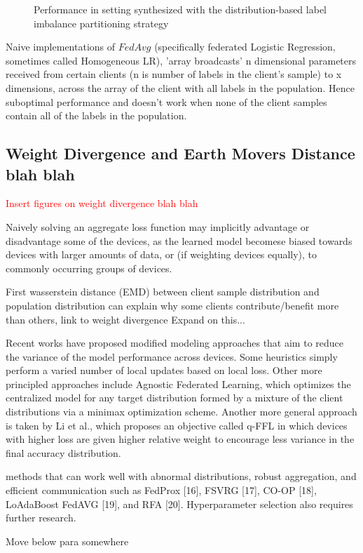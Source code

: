 \documentclass[letterpaper]{article} %
\begin{document}
\begin{figure}[h]
\caption{Performance in setting synthesized with the distribution-based label imbalance partitioning strategy}
\end{figure}


Naive implementations of $FedAvg$ (specifically federated Logistic Regression, sometimes called Homogeneous LR), 'array broadcasts' n dimensional parameters received from certain clients (n is number of labels in the client's sample) to x dimensions, across the array of the client with all labels in the population. Hence suboptimal performance and doesn't work when none of the client samples contain all of the labels in the population.

\subsection{Weight Divergence and Earth Movers Distance blah blah}

\textcolor{red}{Insert figures on weight divergence blah blah}

Naively solving an aggregate loss function may implicitly advantage or disadvantage some of the devices, as the learned model becomese biased towards devices with larger amounts of data, or (if weighting devices equally), to commonly occurring groups of devices. 

First wasserstein distance (EMD) between client sample distribution and population distribution can explain why some clients contribute/benefit more than others, link to weight divergence Expand on this...

Recent works have proposed modified modeling approaches that aim to reduce the variance of the model performance across devices. Some heuristics simply perform a varied number of local updates based
on local loss. Other more principled approaches include Agnostic Federated Learning, which optimizes the centralized model for any target distribution formed by a mixture of the client distributions via a minimax optimization scheme. Another more general approach is taken by Li et al., which proposes an objective called q-FFL in which devices with higher loss are given higher relative weight to encourage less variance in the final accuracy distribution.

methods that can work
well with abnormal distributions, robust aggregation, and
efficient communication such as FedProx [16], FSVRG [17],
CO-OP [18], LoAdaBoost FedAVG [19], and RFA [20].
Hyperparameter selection also requires further research.

Move below para somewhere
\end{document}
